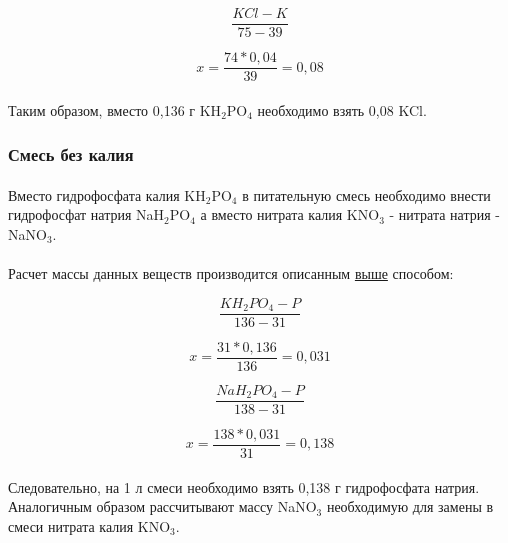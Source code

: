\begin{equation}
	\frac{KCl - K}{75 - 39}
\end{equation}

\begin{equation}
		x = \frac{74*0,04}{39} = 0,08
	\end{equation}
	
\paragraph*{}Таким образом, вместо 0,136 г KH${_2}$PO${_4}$ необходимо взять 0,08  KCl.

\subsubsection*{Смесь без калия}

\paragraph*{}Вместо гидрофосфата калия KH${_2}$PO${_4}$ в питательную смесь необходимо внести гидрофосфат натрия NaH${_2}$PO${_4}$ а вместо нитрата калия KNO${_3}$ - нитрата натрия - NaNO${_3}$.

\paragraph*{}Расчет массы данных веществ производится описанным \hyperlink{potashyum_mass}{выше} способом:

\begin{equation}
	\frac{KH{_2}PO{_4} - P}{136 - 31}
\end{equation}

\begin{equation}
		x = \frac{31*0,136}{136} = 0,031
	\end{equation}
	
\begin{equation}
	\frac{NaH{_2}PO{_4} - P}{138 - 31}
\end{equation}
	
\begin{equation}
		x = \frac{138*0,031}{31} = 0,138
	\end{equation}

\paragraph{}Следовательно, на 1 л смеси необходимо взять 0,138 г гидрофосфата натрия. Аналогичным образом рассчитывают массу NaNO${_3}$ необходимую для замены в смеси нитрата калия KNO${_3}$.

